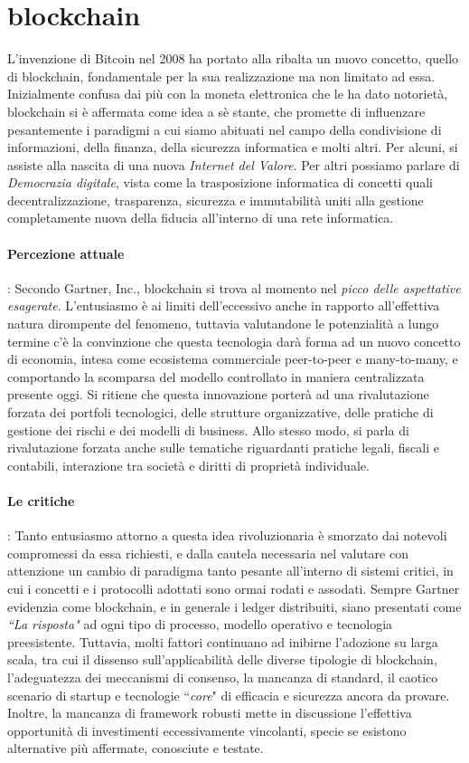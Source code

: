 \section{blockchain}
	L'invenzione di Bitcoin nel 2008 ha portato alla ribalta un nuovo concetto, quello di blockchain, fondamentale per la sua realizzazione ma non limitato ad essa. Inizialmente confusa dai più con la moneta elettronica che le ha dato notorietà,  blockchain si è affermata come idea a sè stante, che promette di influenzare pesantemente i paradigmi a cui siamo abituati nel campo della condivisione di informazioni, della finanza, della sicurezza informatica e molti altri. Per alcuni, si assiste alla nascita di una nuova \emph{Internet del Valore}. Per altri possiamo parlare di \emph{Democrazia digitale}, vista come la trasposizione informatica di concetti quali decentralizzazione, trasparenza, sicurezza e immutabilità uniti alla gestione completamente nuova della fiducia all'interno di una rete informatica.
	\paragraph{Percezione attuale}: Secondo Gartner, Inc.\cite{gartner}, blockchain si trova al momento nel \emph{picco delle aspettative esagerate}. L'entusiasmo è ai limiti dell'eccessivo anche in rapporto all'effettiva natura dirompente del fenomeno, tuttavia valutandone le potenzialità a lungo termine c'è la convinzione che questa tecnologia darà forma ad un nuovo concetto di economia, intesa come ecosistema commerciale peer-to-peer e many-to-many, e comportando la scomparsa del modello controllato in maniera centralizzata presente oggi. Si ritiene che questa innovazione porterà ad una rivalutazione forzata dei portfoli tecnologici, delle strutture organizzative, delle pratiche di gestione dei rischi e dei modelli di business. Allo stesso modo, si parla di rivalutazione forzata anche sulle tematiche riguardanti pratiche legali, fiscali e contabili, interazione tra società e diritti di proprietà individuale.
	\paragraph{Le critiche}: Tanto entusiasmo attorno a questa idea rivoluzionaria è smorzato dai notevoli compromessi da essa richiesti, e dalla cautela necessaria nel valutare con attenzione un cambio di paradigma tanto pesante all'interno di sistemi critici, in cui i concetti e i protocolli adottati sono ormai rodati e assodati. Sempre Gartner evidenzia come blockchain, e in generale i ledger distribuiti, siano presentati come \emph{``La risposta"} ad ogni tipo di processo, modello operativo e tecnologia preesistente. Tuttavia, molti fattori continuano ad inibirne l'adozione su larga scala, tra cui il dissenso sull'applicabilità delle diverse tipologie di blockchain, l'adeguatezza dei meccanismi di consenso, la mancanza di standard, il caotico scenario di startup e tecnologie ``\emph{core}" di efficacia e sicurezza ancora da provare. Inoltre, la mancanza di framework robusti mette in discussione l'effettiva opportunità di investimenti eccessivamente vincolanti, specie se esistono alternative più affermate, conosciute e testate.

